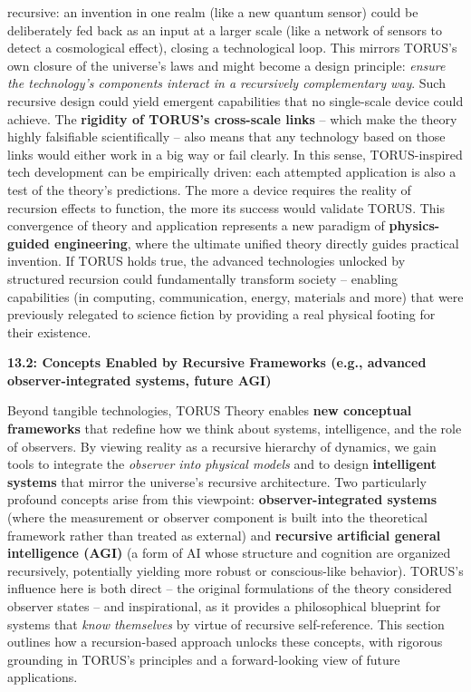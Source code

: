 \begin{itemize}
{  recursive}: an invention in one realm (like a new quantum sensor)
  could be deliberately fed back as an input at a larger scale (like a
  network of sensors to detect a cosmological effect), closing a
  technological loop. This mirrors TORUS's own closure of the universe's
  laws and might become a design principle: \emph{ensure the
  technology's components interact in a recursively complementary way}.
  Such recursive design could yield emergent capabilities that no
  single-scale device could achieve. The \textbf{rigidity of TORUS's
  cross-scale links} -- which make the theory highly falsifiable
  scientifically​ -- also means that any technology based on those links
  would either work in a big way or fail clearly. In this sense,
  TORUS-inspired tech development can be empirically driven: each
  attempted application is also a test of the theory's predictions. The
  more a device requires the reality of recursion effects to function,
  the more its success would validate TORUS. This convergence of theory
  and application represents a new paradigm of \textbf{physics-guided
  engineering}, where the ultimate unified theory directly guides
  practical invention. If TORUS holds true, the advanced technologies
  unlocked by structured recursion could fundamentally transform society
  -- enabling capabilities (in computing, communication, energy,
  materials and more) that were previously relegated to science fiction
  by providing a real physical footing for their existence.
\end{itemize}

\textbf{13.2: Concepts Enabled by Recursive Frameworks (e.g., advanced
observer-integrated systems, future AGI)}

Beyond tangible technologies, TORUS Theory enables \textbf{new
conceptual frameworks} that redefine how we think about systems,
intelligence, and the role of observers. By viewing reality as a
recursive hierarchy of dynamics, we gain tools to integrate the
\emph{observer into physical models} and to design \textbf{intelligent
systems} that mirror the universe's recursive architecture. Two
particularly profound concepts arise from this viewpoint:
\textbf{observer-integrated systems} (where the measurement or observer
component is built into the theoretical framework rather than treated as
external) and \textbf{recursive artificial general intelligence (AGI)}
(a form of AI whose structure and cognition are organized recursively,
potentially yielding more robust or conscious-like behavior). TORUS's
influence here is both direct -- the original formulations of the theory
considered observer states -- and inspirational, as it provides a
philosophical blueprint for systems that \emph{know themselves} by
virtue of recursive self-reference. This section outlines how a
recursion-based approach unlocks these concepts, with rigorous grounding
in TORUS's principles and a forward-looking view of future applications.


